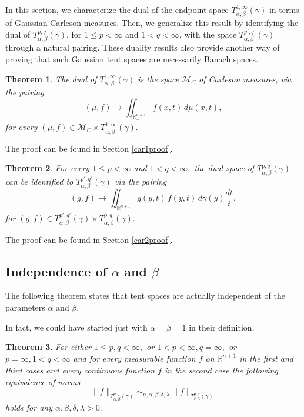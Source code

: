 \documentclass[leqno,11pt]{amsart}
\theoremstyle{plain}
\newtheorem{teo}{Theorem}
\theoremstyle{remark}
\begin{document}
{In this section, we characterize the dual of the endpoint space $T^{1,\infty}_{\alpha, \beta} (\gamma)$ in terms of Gaussian Carleson measures. Then, we generalize this result by identifying the dual of $T^{p,q}_{\alpha, \beta} (\gamma)$, for $1 \leq p < \infty$ and $1 < q < \infty$, with the space $T^{p',q'}_{\alpha, \beta} (\gamma)$ through a natural pairing. These duality results {also provide another way of proving that such Gaussian tent spaces are necessarily Banach spaces.}

 

\begin{teo}\label{car1}
The dual of $T^{1,\infty}_{\alpha, \beta} (\gamma)$ is the space $\mathscr{M}_C$ of Carleson measures, via the pairing
\begin{equation}
(\mu, f)\to \iint_{\mathbb{R}^{n+1}_+} f(x,t)\, d\mu(x,t),
\end{equation}
for every $(\mu, f)\in \mathscr{M}_C\times T^{1,\infty}_{\alpha, \beta}(\gamma).$
\end{teo}


The proof can be found in Section \ref{car1proof}.
\begin{teo}\label{car2}
For every $1\le p<\infty$ and $1<q<\infty,$ the dual space of $T^{p,q}_{\alpha, \beta}(\gamma)$ can be identified to $T^{p',q'}_{\alpha, \beta}(\gamma)$ via the pairing
\begin{equation}
(g,f)\to \iint_{\mathbb{R}^{n+1}_+} g(y,t)\, f(y,t)\, d\gamma (y)\frac{dt}{t},
\end{equation}
for $(g,f)\in T^{p',q'}_{\alpha,\beta}(\gamma)\times T^{p,q}_{\alpha, \beta}(\gamma).$
\end{teo}
 
The proof can be found in Section \ref{car2proof}.


\subsection{Independence of  $\alpha$ and $\beta$}\label{new}

 
 The following theorem states that tent spaces are actually independent of the parameters $\alpha$ and $\beta$. 
  
 In fact, we could have started just with $\alpha=\beta=1$ in their definition.  

\begin{teo}\label{independencia}
For either $1\le p,q<\infty,$ or $1< p<\infty, q=\infty,$ or $p=\infty, 1<q<\infty$ and for every  measurable function $f$ on $\mathbb{R}^{n+1}_+$ in the first and third cases and every continuous function $f$ in the second case the following equivalence of norms  $$\|f\|_{T_{\alpha, \beta}^{p,q}(\gamma)}\sim_{n, \alpha, \beta, \delta, \lambda}\, \|f\|_{T^{p,q}_{\delta, \lambda}(\gamma)}$$ holds for any $\alpha, \beta, \delta, \lambda>0.$
\end{teo}

}
\end{document}
